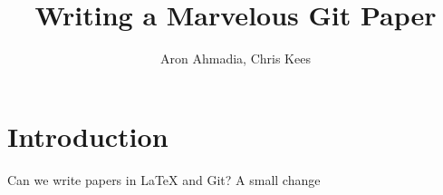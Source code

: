 \documentclass[12pt]{article}
\author{Aron Ahmadia, Chris Kees} \title{Writing a Marvelous Git Paper}
\begin{document}
\maketitle

\section{Introduction}

Can we write papers in LaTeX and Git?
A small change
\end{document}
